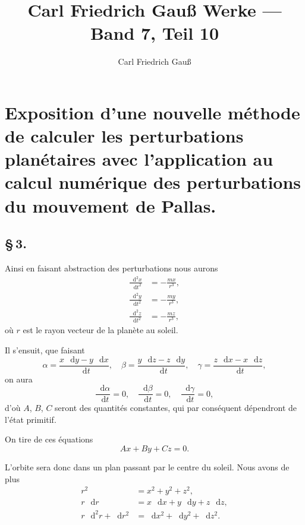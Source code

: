 \documentclass[12pt,a4paper]{article}
\title{Carl Friedrich Gau\ss{} Werke --- Band 7, Teil 10}
\author{Carl Friedrich Gau\ss{}}
\date{}
\newcommand{\dd}{\mathop{}\!\mathrm{d}}
\begin{document}
\maketitle
\thispagestyle{empty}

\tableofcontents
\newpage

\section*{Exposition d'une nouvelle m\'{e}thode de calculer les perturbations plan\'{e}taires avec l'application au calcul num\'{e}rique des perturbations du mouvement de Pallas.}

\subsection*{\S\,3.}

Ainsi en faisant abstraction des perturbations nous aurons
\begin{align}
\frac{\dd^2 x}{\dd t^2} &= -\frac{mx}{r^3}, \tag{1} \\
\frac{\dd^2 y}{\dd t^2} &= -\frac{my}{r^3}, \tag{2} \\
\frac{\dd^2 z}{\dd t^2} &= -\frac{mz}{r^3}, \tag{3}
\end{align}
o\`{u} $r$ est le rayon vecteur de la plan\`{e}te au soleil.

Il s'ensuit, que faisant
\begin{equation}
\alpha = \frac{x\,\dd y - y\,\dd x}{\dd t}, \quad
\beta = \frac{y\,\dd z - z\,\dd y}{\dd t}, \quad
\gamma = \frac{z\,\dd x - x\,\dd z}{\dd t}, \tag{4}
\end{equation}
on aura
\begin{equation}
\frac{\dd \alpha}{\dd t} = 0, \quad \frac{\dd \beta}{\dd t} = 0, \quad \frac{\dd \gamma}{\dd t} = 0, \tag{5}
\end{equation}
d'o\`{u} $A$, $B$, $C$ seront des quantit\'{e}s constantes, qui par cons\'{e}quent d\'{e}pendront de l'\'{e}tat primitif.

On tire de ces \'{e}quations
\begin{equation}
Ax + By + Cz = 0. \tag{6}
\end{equation}

L'orbite sera donc dans un plan passant par le centre du soleil. Nous avons de plus
\begin{align*}
r^2 &= x^2 + y^2 + z^2, \\
r\,\dd r &= x\,\dd x + y\,\dd y + z\,\dd z, \\
r\,\dd^2 r + \dd r^2 &= \dd x^2 + \dd y^2 + \dd z^2.
\end{align*}
\end{document}
